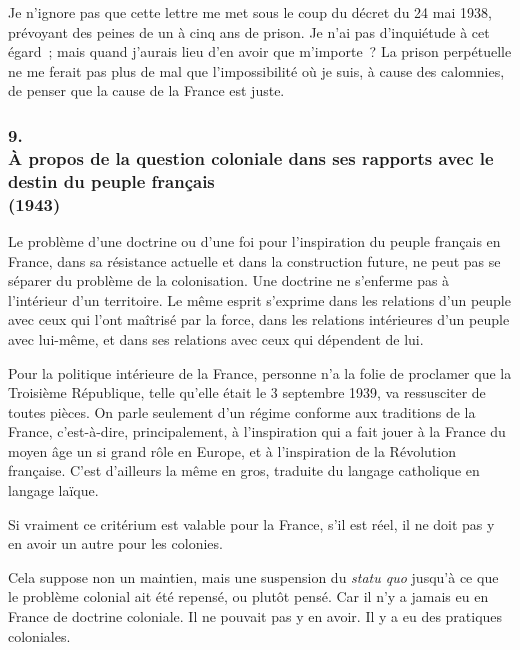 \documentclass[french,twoside]{book} %
\begin{document}
Je n'ignore pas que cette lettre me met sous le coup du décret du 24 mai 1938, prévoyant des peines de un à cinq ans de prison. Je n'ai pas d'inquiétude à cet égard ; mais quand j'aurais lieu d'en avoir que m'importe ? La prison perpétuelle ne me ferait pas plus de mal que l'impossibilité où je suis, à cause des calomnies, de penser que la cause de la France est juste.\par

\begin{center}
\noindent \centerline{}
\end{center}

\subsubsection[{9. À propos de la question coloniale dans ses rapports avec le destin du peuple français  (1943)}]{9. \\
À propos de la question coloniale dans ses rapports avec le destin du peuple français \protect\footnotemark  \\
(1943)}
\noindent \par
Le problème d'une doctrine ou d'une foi pour l'inspiration du peuple français en France, dans sa résistance actuelle et dans la construction future, ne peut pas se séparer du problème de la colonisation. Une doctrine ne s'enferme pas à l'intérieur d'un territoire. Le même esprit s'exprime dans les relations d'un peuple avec ceux qui l'ont maîtrisé par la force, dans les relations intérieures d'un peuple avec lui-même, et dans ses relations avec ceux qui dépendent de lui.\par
Pour la politique intérieure de la France, personne n'a la folie de proclamer que la Troisième République, telle qu'elle était le 3 septembre 1939, va ressusciter de toutes pièces. On parle seulement d'un régime conforme aux traditions de la France, c'est-à-dire, principalement, à l'inspiration qui a fait jouer à la France du moyen âge un si grand rôle en Europe, et à l'inspiration de la Révolution française. C'est d'ailleurs la même en gros, traduite du langage catholique en langage laïque.\par
Si vraiment ce critérium est valable pour la France, s'il est réel, il ne doit pas y en avoir un autre pour les colonies.\par
Cela suppose non un maintien, mais une suspension du {\itshape statu quo} jusqu'à ce que le problème colonial ait été repensé, ou plutôt pensé. Car il n'y a jamais eu en France de doctrine coloniale. Il ne pouvait pas y en avoir. Il y a eu des pratiques coloniales.\par
\end{document}
